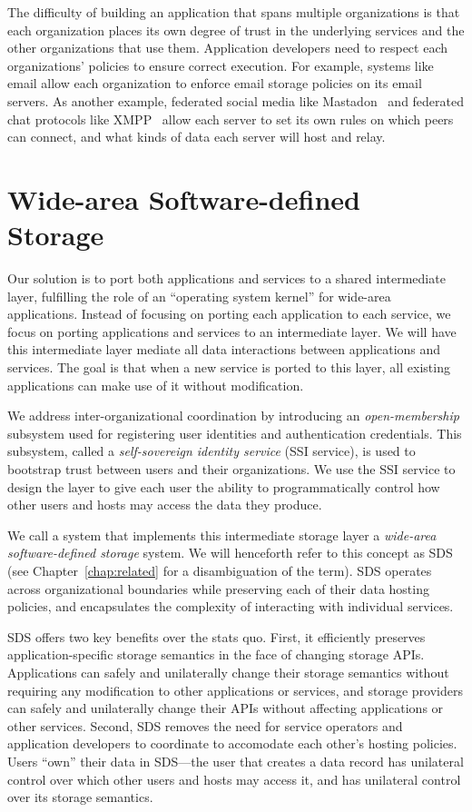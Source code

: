The difficulty of building an application that spans multiple organizations
is that each organization places its own degree of trust in the underlying
services and the other organizations that use them.  Application developers
need to respect each organizations' policies to ensure correct execution.
For example, systems like email allow each organization to enforce email
storage policies on its email servers.  As another example, federated social
media like Mastadon~\cite{mastadon} and federated chat protocols like
XMPP~\cite{xmpp} allow each server to set its own rules on which peers can
connect, and what kinds of data each server will host and relay.

\section{Wide-area Software-defined Storage}

Our solution is to port both applications and services to a shared
intermediate layer, fulfilling the role of an ``operating system kernel'' for
wide-area applications.
Instead of focusing on porting each application to each service, we focus on porting applications and
services to an intermediate layer.  We will have this intermediate layer mediate all
data interactions between applications and services.  The goal is that when a new service
is ported to this layer, all existing applications can make use of it without
modification.

We address inter-organizational coordination by introducing an
\emph{open-membership} subsystem used for registering user identities and authentication
credentials.  This subsystem, called a \emph{self-sovereign
identity service} (SSI service), is used to bootstrap trust between users and their
organizations.   We use the SSI service to design the layer to give each user the ability to
programmatically control how other users and hosts may access the data they
produce.

We call a system that implements this intermediate storage layer a
\textit{wide-area software-defined storage} system.  We will henceforth refer to
this concept as SDS (see Chapter~\ref{chap:related} for a disambiguation of the
term).  SDS operates across organizational boundaries while preserving each of
their data hosting policies, and
encapsulates the complexity of interacting with individual services.

SDS offers two key benefits over the stats quo.  First, it efficiently preserves
application-specific storage semantics in the face of changing storage APIs.
Applications can safely and unilaterally change their storage semantics without
requiring any modification to other applications or services, and
storage providers can safely and unilaterally change their APIs without
affecting applications or other services. 
Second, SDS removes the need for service operators and
application developers to coordinate to accomodate each other's hosting
policies.  Users ``own'' their data in SDS---the user that creates a data record
has unilateral control over which other users and hosts may access it, and has
unilateral control over its storage semantics.

